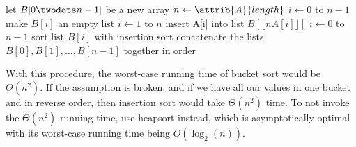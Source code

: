 \documentclass{article}
\begin{document}
\begin{codebox}
\li let $B[0 \twodots n-1]$ be a new array
\li $n \gets \attrib{A}{length}$
\li \For $i \gets 0$ to $n-1$
\li     \Do
            make $B[i]$ an empty list
        \End
\li \For $i \gets 1$ to $n$
\li     \Do
            insert A[i] into list $B[\lfloor n A[i] \rfloor]$
        \End 
\li \For $i \gets 0$ to $n-1$
\li     \Do
            sort list $B[i]$ with insertion sort
        \End
\li concatenate the lists $B[0], B[1], \ldots, B[n-1]$ together in order
\end{codebox}

With this procedure, the worst-case running time of bucket sort would be $\Theta(n^{2})$. If the assumption is broken, and if we have all our values in one bucket and in reverse order, then insertion sort would take $\Theta(n^{2})$ time. To not invoke the $\Theta{(n^2)}$ running time, use heapsort instead, which is asymptotically optimal with its worst-case running time being $O(\log_2(n))$.
\end{document}
